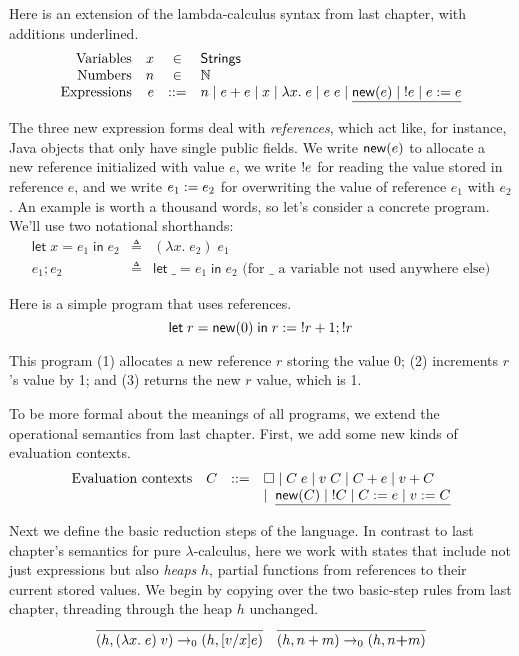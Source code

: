 \documentclass{amsbook}
\theoremstyle{definition}
\theoremstyle{remark}
\numberwithin{section}{chapter}
\numberwithin{equation}{chapter}
\begin{document}
Here is an extension of the lambda-calculus syntax from last chapter, with additions underlined.
$$\begin{array}{rrcl}
  \textrm{Variables} & x &\in& \mathsf{Strings} \\
  \textrm{Numbers} & n &\in& \mathbb N \\
  \textrm{Expressions} & e &::=& n \mid e + e \mid x \mid \lambda x. \; e \mid e \; e \mid \underline{\mathsf{new}(e) \mid \; !e \mid e := e}
\end{array}$$

\newcommand{\elet}[3]{\mathsf{let} \; #1 = #2 \; \mathsf{in} \; #3}

The three new expression forms deal with \emph{references}, which act like, for instance, Java objects that only have single public fields.
We write $\mathsf{new}(e)$ to allocate a new reference initialized with value $e$, we write $!e$ for reading the value stored in reference $e$, and we write $e_1 := e_2$ for overwriting the value of reference $e_1$ with $e_2$.
An example is worth a thousand words, so let's consider a concrete program.
We'll use two notational shorthands:
\begin{eqnarray*}
  \elet{x}{e_1}{e_2} &\triangleq& (\lambda x. \; e_2) \; e_1 \\
  e_1; e_2 &\triangleq& \elet{\_}{e_1}{e_2} \textrm{ (for $\_$ a variable not used anywhere else)}
\end{eqnarray*}

Here is a simple program that uses references.
$$\elet{r}{\newref{0}}{\writeref{r}{\; \readref{r} + 1}; \readref{r}}$$

This program (1) allocates a new reference $r$ storing the value 0; (2) increments $r$'s value by 1; and (3) returns the new $r$ value, which is 1.

To be more formal about the meanings of all programs, we extend the operational semantics from last chapter.
First, we add some new kinds of evaluation contexts.
$$\begin{array}{rrcl}
  \textrm{Evaluation contexts} & C &::=& \Box \mid C \; e \mid v \; C \mid C + e \mid v + C \\
  &&& \mid \; \underline{\mathsf{new}(C) \mid \; !C \mid C := e \mid v := C}
\end{array}$$

Next we define the basic reduction steps of the language.
In contrast to last chapter's semantics for pure $\lambda$-calculus, here we work with states that include not just expressions but also \emph{heaps} $h$, partial functions from references to their current stored values.
We begin by copying over the two basic-step rules from last chapter, threading through the heap $h$ unchanged.
$$\infer{\smallstepo{(h, (\lambda x. \; e) \; v)}{(h, \subst{e}{x}{v})}}{}
\quad \infer{\smallstepo{(h, n + m)}{(h, n \textbf{+} m)}}{}$$
\end{document}
